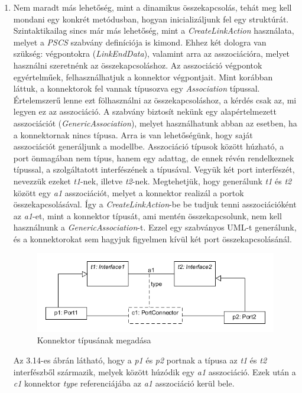 \documentclass[a4paper,12pt]{report}
\begin{document}
\begin{enumerate}
\item Nem maradt más lehetőség, mint a dinamikus összekapcsolás, tehát meg kell mondani egy konkrét metódusban, hogyan inicializáljunk fel egy struktúrát. Szintaktikailag sincs már más lehetőség, mint a \textit{CreateLinkAction} használata, melyet a \textit{PSCS} szabvány definíciója is kimond. Ehhez két dologra van szükség: végpontokra (\textit{LinkEndData}), valamint arra az asszociációra, melyet használni szeretnénk az összekapcsoláshoz. Az asszociáció végpontok egyértelműek, felhasználhatjuk a konnektor végpontjait. Mint korábban láttuk, a konnektorok fel vannak típusozva egy \textit{Association} típussal. Értelemszerű lenne ezt fölhasználni az összekapcsoláshoz, a kérdés csak az, mi legyen ez az asszociáció. A szabvány biztosít nekünk egy alapértelmezett asszociációt (\textit{GenericAssociation}), melyet használhatunk abban az esetben, ha a konnektornak nincs típusa. Arra is van lehetőségünk, hogy saját asszociációt generáljunk a modellbe. Asszociáció típusok között húzható, a port önmagában nem típus, hanem egy adattag, de ennek révén rendelkeznek típussal, a szolgáltatott interfészének a típusával. Vegyük két port interfészét, nevezzük ezeket \textit{t1}-nek, illetve \textit{t2}-nek.  Megtehetjük, hogy generálunk \textit{t1} és \textit{t2} között egy \textit{a1} asszociációt, melyet a konnektor realizál a portok összekapcsolásával. Így a \textit{CreateLinkAction}-be be tudjuk tenni asszociációként az \textit{a1}-et, mint a konnektor típusát, ami mentén összekapcsolunk, nem kell használnunk a \textit{GenericAssociation}-t. Ezzel egy szabványos UML-t generálunk, és a konnektorokat sem hagyjuk figyelmen kívül két port összekapcsolásánál. \\

\begin{figure}[H]
\begin{center}
\includegraphics[scale=0.8]{connect_type.png}
\end{center}
\caption{Konnektor típusának megadása}
\end{figure}

Az 3.14-es ábrán látható, hogy a \textit{p1} és \textit{p2} portnak a típusa az \textit{t1} és \textit{t2} interfészből származik, melyek között húzódik egy \textit{a1} asszociáció. Ezek után a \textit{c1} konnektor \textit{type} referenciájába az \textit{a1} asszociáció kerül bele. 
\end{enumerate}
\end{document}
